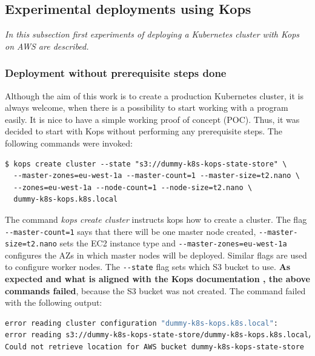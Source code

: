 \subsection{Experimental deployments using Kops}
\textit{In this subsection first experiments of deploying a Kubernetes cluster with Kops on AWS are described.}
\\

\subsubsection{Deployment without prerequisite steps done}

Although the aim of this work is to create a production Kubernetes cluster, it is always welcome, when there is a possibility to start working with a program easily. It is nice to have a simple working proof of concept (POC). Thus, it was decided to start with Kops without performing any prerequisite steps. The following commands were invoked:
\begin{mdframed}[linecolor=white]
\begin{lstlisting}[caption={Command used to create a cluster with kops, without prerequisite steps performed}]
$ kops create cluster --state "s3://dummy-k8s-kops-state-store" \
  --master-zones=eu-west-1a --master-count=1 --master-size=t2.nano \
  --zones=eu-west-1a --node-count=1 --node-size=t2.nano \
  dummy-k8s-kops.k8s.local
\end{lstlisting}
\end{mdframed}

The command \textit{kops create cluster} instructs kops how to create a cluster. The flag \verb|--master-count=1| says that there will be one master node created, \verb|--master-size=t2.nano| sets the EC2 instance type and \verb|--master-zones=eu-west-1a| configures the AZs in which master nodes will be deployed. Similar flags are used to configure worker nodes. The \verb|--state| flag sets which S3 bucket to use.  \textbf{As expected and what is aligned with the Kops documentation \cite{online-kops-aws}, the above commands failed}, because the S3 bucket was not created. The command failed with the following output:
\begin{lstlisting}[basicstyle=\tiny,caption={Output of the commands used to create a cluster with Kops, without prerequisite steps performed},captionpos=b,language=Bash,xleftmargin=1cm]
error reading cluster configuration "dummy-k8s-kops.k8s.local":
error reading s3://dummy-k8s-kops-state-store/dummy-k8s-kops.k8s.local/config:
Could not retrieve location for AWS bucket dummy-k8s-kops-state-store
\end{lstlisting}

